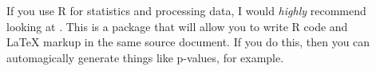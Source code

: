 \begin{description}
	\item[]{%
		If you use R for statistics and processing data, I would \emph{highly} recommend looking at \href{http://yihui.name/knitr/}{}.
		This is a package that will allow you to write R code and \LaTeX{} markup in the same source document.
		If you do this, then you can automagically generate things like p-values, for example.%
	}

\end{description}